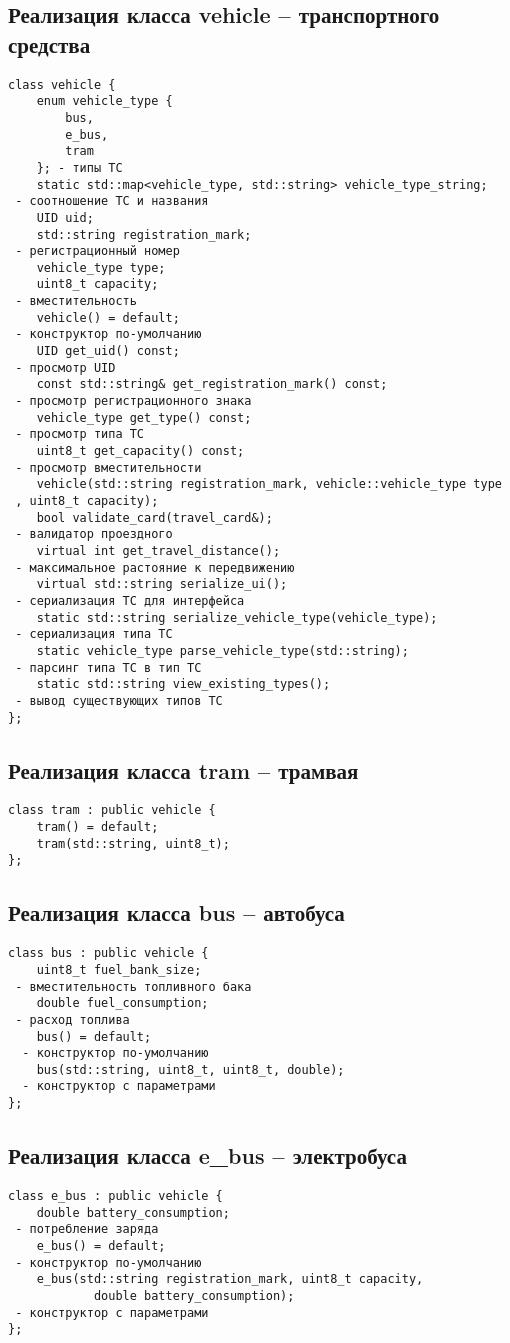 \subsection{Реализация класса vehicle -- транспортного средства}
\begin{verbatim}
class vehicle {
	enum vehicle_type {
		bus,
		e_bus,
		tram
	}; - типы ТС
	static std::map<vehicle_type, std::string> vehicle_type_string;
 - соотношение ТС и названия
	UID uid;
	std::string registration_mark;
 - регистрационный номер
	vehicle_type type;
	uint8_t capacity;
 - вместительность
	vehicle() = default;
 - конструктор по-умолчанию
	UID get_uid() const;
 - просмотр UID
	const std::string& get_registration_mark() const;
 - просмотр регистрационного знака
	vehicle_type get_type() const;
 - просмотр типа ТС
	uint8_t get_capacity() const;
 - просмотр вместительности
	vehicle(std::string registration_mark, vehicle::vehicle_type type
 , uint8_t capacity);
	bool validate_card(travel_card&);
 - валидатор проездного
	virtual int get_travel_distance();
 - максимальное растояние к передвижению
	virtual std::string serialize_ui();
 - сериализация ТС для интерфейса
	static std::string serialize_vehicle_type(vehicle_type);
 - сериализация типа ТС
	static vehicle_type parse_vehicle_type(std::string);
 - парсинг типа ТС в тип ТС
	static std::string view_existing_types();
 - вывод существующих типов ТС
};
\end{verbatim}

\subsection{Реализация класса tram -- трамвая}
\begin{verbatim}
class tram : public vehicle {
	tram() = default;
	tram(std::string, uint8_t);
};
\end{verbatim}

\subsection{Реализация класса bus -- автобуса}
\begin{verbatim}
class bus : public vehicle {
	uint8_t fuel_bank_size;
 - вместительность топливного бака
	double fuel_consumption;
 - расход топлива
	bus() = default;
  - конструктор по-умолчанию
	bus(std::string, uint8_t, uint8_t, double);
  - конструктор c параметрами   
};
\end{verbatim}

\subsection{Реализация класса e\_bus -- электробуса}
\begin{verbatim}
class e_bus : public vehicle {
	double battery_consumption;
 - потребление заряда
	e_bus() = default;
 - конструктор по-умолчанию
	e_bus(std::string registration_mark, uint8_t capacity,
			double battery_consumption);
 - конструктор c параметрами 
};

\end{verbatim}

